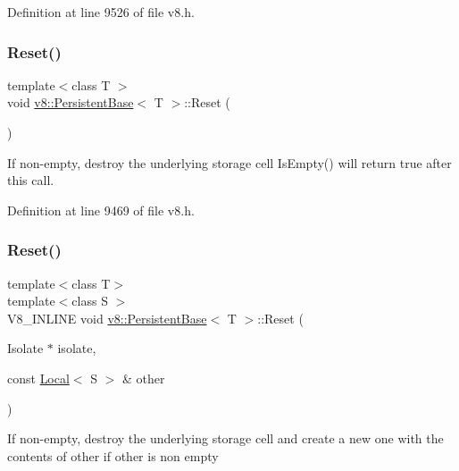 Definition at line 9526 of file v8.\+h.

\mbox{\label{classv8_1_1PersistentBase_a174bb1e45b18fd4eeaee033622825bb8}} 
\subsubsection{\texorpdfstring{Reset()}{Reset()}\hspace{0.1cm}{\footnotesize\ttfamily [1/3]}}
{\footnotesize\ttfamily template$<$class T $>$ \\
void \mbox{\hyperlink{classv8_1_1PersistentBase}{v8\+::\+Persistent\+Base}}$<$ T $>$\+::Reset (\begin{DoxyParamCaption}{ }\end{DoxyParamCaption})}

If non-\/empty, destroy the underlying storage cell Is\+Empty() will return true after this call. 

Definition at line 9469 of file v8.\+h.

\mbox{\label{classv8_1_1PersistentBase_a11164f0dfc9a16d79809236e7a9670aa}} 
\subsubsection{\texorpdfstring{Reset()}{Reset()}\hspace{0.1cm}{\footnotesize\ttfamily [2/3]}}
{\footnotesize\ttfamily template$<$class T$>$ \\
template$<$class S $>$ \\
V8\+\_\+\+I\+N\+L\+I\+NE void \mbox{\hyperlink{classv8_1_1PersistentBase}{v8\+::\+Persistent\+Base}}$<$ T $>$\+::Reset (\begin{DoxyParamCaption}\item[{Isolate $\ast$}]{isolate,  }\item[{const \mbox{\hyperlink{classv8_1_1Local}{Local}}$<$ S $>$ \&}]{other }\end{DoxyParamCaption})}

If non-\/empty, destroy the underlying storage cell and create a new one with the contents of other if other is non empty \mbox{\label{classv8_1_1PersistentBase_af6b8f929b0cbaa83341df48ca3b03ef5}} 
